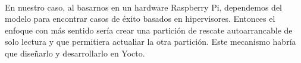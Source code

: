 \paragraph{}En nuestro caso, al basarnos en un hardware Raspberry Pi, dependemos del
modelo para encontrar casos de éxito basados en hipervisores. Entonces el enfoque con
más sentido sería crear una partición de rescate autoarrancable de solo lectura y que
permitiera actualiar la otra partición. Este mecanismo habría que diseñarlo y desarrollarlo
en Yocto.

